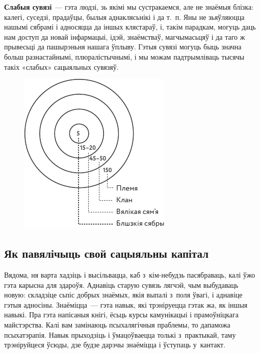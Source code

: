 
\textbf{Слабыя сувязі}~--- гэта людзі, зь якімі мы сустракаемся, але не знаёмыя блізка: калегі, суседзі, прадаўцы, былыя аднаклясьнікі і да т.~п. Яны не зьяўляюцца нашымі сябрамі і адносяцца да іншых клястараў, і, такім парадкам, могуць даць нам доступ да новай інфармацыі, ідэй, знаёмстваў, магчымасьцяў і да таго ж прывесьці да пашырэньня нашага ўплыву. Гэтыя сувязі могуць быць значна больш разнастайнымі, плюралістычнымі, і мы можам падтрымліваць тысячы такіх «слабых» сацыяльных сувязяў.

\begin{figure}[htb!]
  \centering
  \includegraphics[scale=1.5]{willpower/ch10/5.pdf}
\end{figure}

\subsection*{Як павялічыць свой сацыяльны капітал}

Вядома, ня варта хадзіць і высільвацца, каб з~кім-небудзь пасябраваць, калі ўжо гэта карысна для здароўя. Аднавіць старую сувязь лягчэй, чым выбудаваць новую: складзіце сьпіс добрых знаёмых, якія выпалі з~поля ўвагі, і аднавіце гэтыя адносіны. Знаёміцца~--- гэта навык, які трэніруецца гэтак жа, як іншыя навыкі. Пра гэта напісаныя кнігі, ёсьць курсы камунікацыі і прамоўніцкага майстэрства. Калі вам замінаюць псыхалягічныя праблемы, то дапаможа псыхатэрапія. Навык прыходзіць і ўмацоўваецца толькі з~практыкай, таму трэніруйцеся ўсюды, дзе будзе дарэчы знаёміцца і ўступаць у~кантакт.

